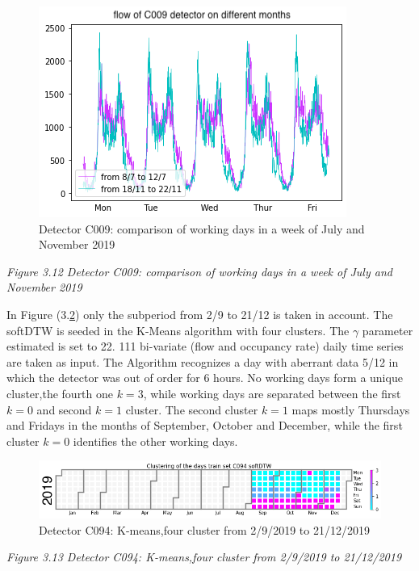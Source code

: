 \documentclass[11pt]{article}
\begin{document}
    \begin{figure}
    \centering
    \includegraphics[scale=0.5]{softDTW july vs november 2019.png}
    \caption{Detector C009: comparison of working days in a week of July and November 2019}
    \label{fig:3.12}
\end{figure}

\emph{\small Figure 3.12 Detector C009: comparison of working days in a week of July and November 2019}

    In Figure (3.\ref{fig:3.13}) only the subperiod from 2/9 to 21/12 is
taken in account. The softDTW is seeded in the K-Means algorithm with
four clusters. The \(\gamma\) parameter estimated is set to 22. 111
bi-variate (flow and occupancy rate) daily time series are taken as
input. The Algorithm recognizes a day with aberrant data 5/12 in which
the detector was out of order for 6 hours. No working days form a unique
cluster,the fourth one \(k=3\), while working days are separated between
the first \(k=0\) and second \(k=1\) cluster. The second cluster \(k=1\)
maps mostly Thursdays and Fridays in the months of September, October
and December, while the first cluster \(k=0\) identifies the other
working days.

    \begin{figure}
    \centering
    \includegraphics{softDTW K=4 winter 2019.png}
    \caption{Detector C094: K-means,four cluster from 2/9/2019 to 21/12/2019}
    \label{fig:3.13}
\end{figure}

\emph{\small Figure 3.13 Detector C094: K-means,four cluster from 2/9/2019 to 21/12/2019}
\end{document}
